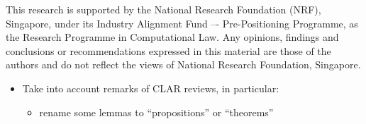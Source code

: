 \documentclass{tlp}
\begin{document}
This research is supported by the National Research Foundation (NRF),
Singapore, under its Industry Alignment Fund –- Pre-Positioning Programme, as
the Research Programme in Computational Law. Any opinions, findings and
conclusions or recommendations expressed in this material are those of the
authors and do not reflect the views of National Research Foundation,
Singapore.





\newpage

\begin{itemize}
\item Take into account remarks of CLAR reviews, in particular:
  \begin{itemize}
  \item rename some lemmas to ``propositions'' or ``theorems''
  \end{itemize}
\end{itemize}

\newpage
\appendix




\end{document}
